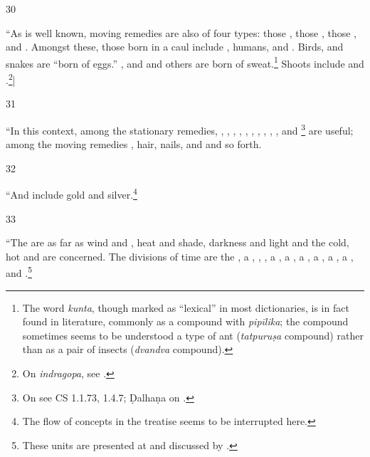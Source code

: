 \begin{translation}
    
    
    \item[30]  
    
“As is well known, moving remedies are also of four types: those
, those ,
those , and . Amongst
these, those born in a caul include , humans, and
.  Birds,  and
snakes are “born of eggs.” ,  and  and others are born of
sweat.\footnote{The word \emph{kunta}, though marked as “lexical” in
    most dictionaries, is in fact found in literature, commonly as a
    compound with \emph{pipīlika}; the compound sometimes seems to be
    understood a type of ant (\emph{tatpuruṣa} compound) rather than as a
    pair of insects (\emph{dvandva} compound).}  Shoots include
     and .\footnote{On
        \emph{indragopa}, see \cite{lien-1978}.}|
    
    \item[31] 
    
“In this context, among the stationary remedies, ,
, , ,
, , ,
, , , and
\footnote{On 
    see CS 1.1.73, 1.4.7; Ḍalhaṇa on .} are useful;
    among the moving remedies , hair, nails, and
     and so forth.
    
    \item[32] 
    
“And  include gold and
silver.\footnote{The flow of concepts in the treatise seems to be
    interrupted here.}
    
    \item[33] 
    
“The  are 
as far as wind and , heat and shade, darkness and
light and the cold, hot and  are concerned.
The divisions of time are the , a
, , , a , a ,
a , a , a , a
, and .\footnote{These units are
    presented at  and discussed by
    \citet[\S\,59]{haya-2017}.}
    

\end{translation}
